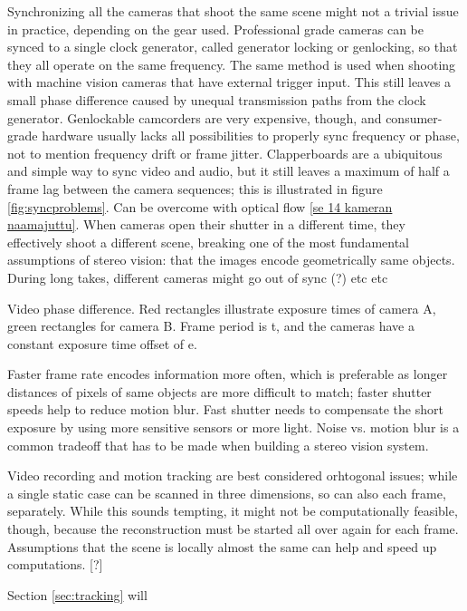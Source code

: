 Synchronizing all the cameras that shoot the same scene might not a trivial issue in practice, depending on the gear used.
Professional grade cameras can be synced to a single clock generator, called generator locking or genlocking, so that they all operate on the same frequency.
The same method is used when shooting with machine vision cameras that have external trigger input.
This still leaves a small phase difference caused by unequal transmission paths from the clock generator.
Genlockable camcorders are very expensive, though, and consumer-grade hardware usually lacks all possibilities to properly sync frequency or phase, not to mention frequency drift or frame jitter.
Clapperboards are a ubiquitous and simple way to sync video and audio, but it still leaves a maximum of half a frame lag between the camera sequences; this is illustrated in figure \ref{fig:syncproblems}. Can be overcome with optical flow \ref{se 14 kameran naamajuttu}.
When cameras open their shutter in a different time, they effectively shoot a different scene, breaking one of the most fundamental assumptions of stereo vision: that the images encode geometrically same objects.
During long takes, different cameras might go out of sync (?) etc etc

{Video phase difference. Red rectangles illustrate exposure times of camera A, green rectangles for camera B. Frame period is t, and the cameras have a constant exposure time offset of e.}

Faster frame rate encodes information more often, which is preferable as longer distances of pixels of same objects are more difficult to match; faster shutter speeds help to reduce motion blur.
Fast shutter needs to compensate the short exposure by using more sensitive sensors or more light.
Noise vs. motion blur is a common tradeoff that has to be made when building a stereo vision system.

Video recording and motion tracking are best considered orhtogonal issues; while a single static case can be scanned in three dimensions, so can also each frame, separately.
While this sounds tempting, it might not be computationally feasible, though, because the reconstruction must be started all over again for each frame.
Assumptions that the scene is locally almost the same can help and speed up computations. [?]

Section \ref{sec:tracking} will 
